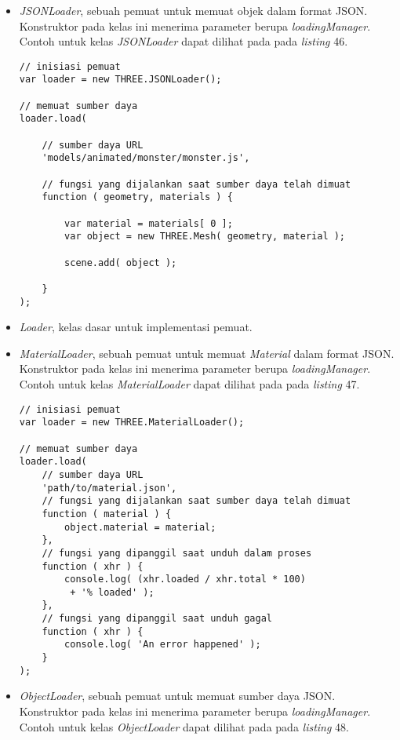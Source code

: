 \documentclass[a4paper,twoside]{article}
\begin{document}
\begin{enumerate}
\begin{itemize}
\begin{itemize}
	\item {\it JSONLoader}, sebuah pemuat untuk memuat objek dalam format JSON. Konstruktor pada kelas ini menerima parameter berupa  {\it loadingManager}. Contoh untuk kelas {\it JSONLoader} dapat dilihat pada pada {\it listing} 46.
	
\begin{lstlisting}[caption={Contoh penggunaan kelas {\it JSONLoader}.},captionpos=b]
// inisiasi pemuat
var loader = new THREE.JSONLoader();

// memuat sumber daya
loader.load(

	// sumber daya URL
	'models/animated/monster/monster.js',

	// fungsi yang dijalankan saat sumber daya telah dimuat
	function ( geometry, materials ) {

		var material = materials[ 0 ];
		var object = new THREE.Mesh( geometry, material );

		scene.add( object );

	}
);
\end{lstlisting}

	\item {\it Loader}, kelas dasar untuk implementasi pemuat.
	
	\item {\it MaterialLoader}, sebuah pemuat untuk memuat {\it Material} dalam format JSON. Konstruktor pada kelas ini menerima parameter berupa  {\it loadingManager}. Contoh untuk kelas {\it MaterialLoader} dapat dilihat pada pada {\it listing} 47.
	
\begin{lstlisting}[caption={Contoh penggunaan kelas {\it MaterialLoader}.},captionpos=b]
// inisiasi pemuat
var loader = new THREE.MaterialLoader();

// memuat sumber daya
loader.load(
	// sumber daya URL
	'path/to/material.json',
	// fungsi yang dijalankan saat sumber daya telah dimuat
	function ( material ) {
		object.material = material;
	},
	// fungsi yang dipanggil saat unduh dalam proses
	function ( xhr ) {
		console.log( (xhr.loaded / xhr.total * 100)
		 + '% loaded' );
	},
	// fungsi yang dipanggil saat unduh gagal
	function ( xhr ) {
		console.log( 'An error happened' );
	}
);
\end{lstlisting}

	\item {\it ObjectLoader}, sebuah pemuat untuk memuat sumber daya JSON. Konstruktor pada kelas ini menerima parameter berupa  {\it loadingManager}. Contoh untuk kelas {\it ObjectLoader} dapat dilihat pada pada {\it listing} 48.
	

\end{itemize}
\end{itemize}
\end{enumerate}
\end{document}

